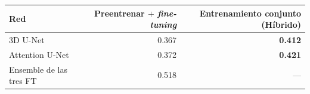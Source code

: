 \begin{tabular}{lrr}
\toprule
Red & Preentrenar $+$ \emph{fine-tuning} & Entrenamiento conjunto (Híbrido) \\
\midrule
3D U-Net & 0.367 & \bfseries 0.412 \\
Attention U-Net & 0.372 & \bfseries 0.421 \\
\midrule
Ensemble de las tres FT & 0.518 & --- \\
\bottomrule
\end{tabular}%